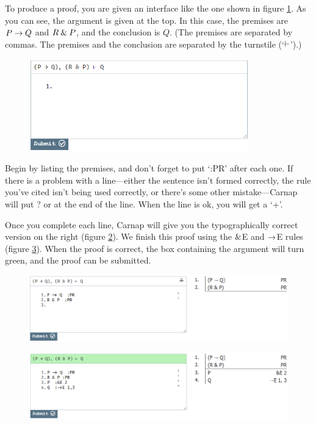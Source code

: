To produce a proof, you are given an interface like the one shown in figure \ref{fig:proof-1a}. As you can see, the argument is given at the top. In this case, the premises are $P \rightarrow Q$ and $R \mathbin{\&} P$, and the conclusion is $Q$. (The premises are separated by commas. The premises and the conclusion are separated by the turnstile (`$\vdash$').)

\begin{figure}
\centering
\includegraphics[height=4cm]{textbook--1a.PNG}
\caption{}
\label{fig:proof-1a}
\end{figure}

Begin by listing the premises, and don't forget to put `:PR' after each one. If there is a problem with a line---either the sentence isn't formed correctly, the rule you've cited isn't being used correctly, or there's some other mistake---Carnap will put \textsf{?} or {\selectfont{}\relax}  at the end of the line. When the line is ok, you will get a `+'.

Once you complete each line, Carnap will give you the typographically correct version on the right (figure \ref{fig:proof-1b}). We finish this proof using the $\mathbin{\&}$E and $\rightarrow$E rules (figure \ref{fig:proof-1c}). When the proof is correct, the box containing the argument will turn green, and the proof can be submitted. 

\begin{figure}[h]
\includegraphics[width=13cm]{textbook--1b.PNG}
\caption{}
\label{fig:proof-1b}
\end{figure}

\begin{figure}[h]
\includegraphics[width=13cm]{textbook--1c.PNG}
\caption{}
\label{fig:proof-1c}
\end{figure}

